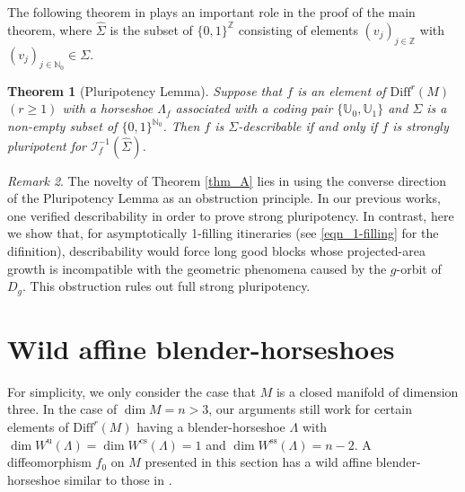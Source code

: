\documentclass{amsart}
\theoremstyle{plain}
\newtheorem{thm}{Theorem}[section]
\theoremstyle{definition}
\theoremstyle{remark}
\newtheorem{remark}[thm]{Remark}
\numberwithin{equation}{section}
\begin{document}
The following theorem  in \cite[Theorem A]{KNS} plays 
an important role in the proof of the main theorem, 
where $\widehat \Sigma$ is the subset of $\{0,1\}^{\mathbb{Z}}$ consisting of elements 
$(v_j)_{j\in \mathbb{Z}}$ with $(v_j)_{j\in \mathbb{N}_0}\in \Sigma$.


\begin{thm}[Pluripotency Lemma]\label{p-lemma}
Suppose that $f$ is an element of $\mathrm{Diff}^r(M)$ $(r\geq 1)$ with a horseshoe $\Lambda_f$ associated with a coding pair $\{ \mathbb U_0, \mathbb U_1 \}$ and 
$\Sigma$ is a non-empty subset of $\{0,1\}^{\mathbb N_0}$.
Then $f$ is $\Sigma$-describable if and only if 
$f$ is strongly pluripotent for $\mathcal{I}_f^{-1}(\widehat \Sigma)$.
\end{thm}





\begin{remark}
The novelty of Theorem \ref{thm_A} lies in using the converse direction of the Pluripotency Lemma as an obstruction principle. 
In our previous works, one verified describability in order to prove strong pluripotency. 
In contrast, here we show that, for asymptotically 1-filling itineraries (see \eqref{eqn_1-filling} for the difinition), describability would force long good blocks whose projected-area growth is incompatible with 
the geometric phenomena caused by the $g$-orbit of $D_g$. 
This obstruction rules out full strong pluripotency.
\end{remark}



\section{Wild affine blender-horseshoes}\label{S_2}

For simplicity, we only consider the case that $M$ is a closed manifold of dimension three.
In the case of $\dim M=n>3$, our arguments still work    
for certain elements of $\mathrm{Diff}^r(M)$ having a blender-horseshoe 
$\Lambda$ with $\dim W^{\mathrm{u}}(\Lambda)=\dim W^{\mathrm{cs}}(\Lambda)=1$ and $\dim W^{\mathrm{ss}}(\Lambda)=n-2$.
A diffeomorphism $f_0$ on $M$ presented in this section has a wild affine blender-horseshoe similar to those in \cite{KNS23, KNS}.

\medskip
\end{document}
